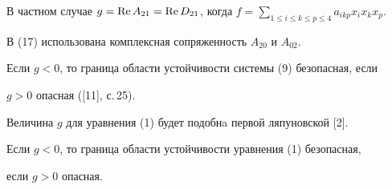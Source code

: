 В частном случае $g=\re A_{21}=\re D_{21}$, когда $f=\sum\limits_{1\le 


i\le k\le p\le4}a_{ikp}x_i x_k x_p$. 


В (17) использована комплексная сопряженность $A_{20}$ и $A_{02}$. 


Если $g<0$, то граница области устойчивости системы (9) безопасная, если 


$g>0$ опасная ([11], с.\,25). 


 


Величина $g$ для уравнения (1) будет подобнa первой ляпуновской [2]. 


Если $g<0$, то граница области устойчивости уравнения (1) безопасная, 


если $g>0$ опасная. 


 


